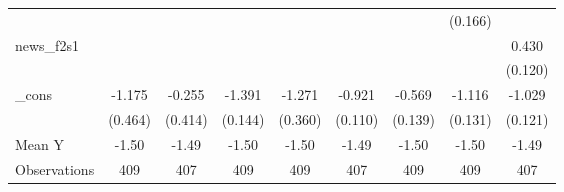 {\begin{tabular}{l*{8}{c}}
            &                     &                     &                     &                     &                     &                     &     (0.166)         &                     \\
\addlinespace
news\_f2s1   &                     &                     &                     &                     &                     &                     &                     &       0.430\sym{***}\\
            &                     &                     &                     &                     &                     &                     &                     &     (0.120)         \\
\addlinespace
\_cons      &      -1.175\sym{**} &      -0.255         &      -1.391\sym{***}&      -1.271\sym{***}&      -0.921\sym{***}&      -0.569\sym{***}&      -1.116\sym{***}&      -1.029\sym{***}\\
            &     (0.464)         &     (0.414)         &     (0.144)         &     (0.360)         &     (0.110)         &     (0.139)         &     (0.131)         &     (0.121)         \\
\midrule
Mean Y      &       -1.50         &       -1.49         &       -1.50         &       -1.50         &       -1.49         &       -1.50         &       -1.50         &       -1.49         \\
Observations&         409         &         407         &         409         &         409         &         407         &         409         &         409         &         407         \\
\bottomrule
\end{tabular}
}

